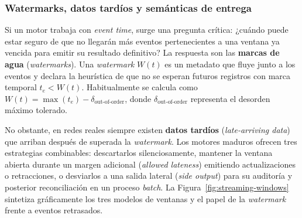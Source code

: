 \subsubsection{Watermarks, datos tardíos y semánticas de entrega}

Si un motor trabaja con \textit{event time}, surge una pregunta crítica: ¿cuándo puede estar seguro de que no llegarán más eventos pertenecientes a una ventana ya vencida para emitir su resultado definitivo? La respuesta son las \textbf{marcas de agua} (\textit{watermarks}). Una \textit{watermark} $W(t)$ es un metadato que fluye junto a los eventos y declara la heurística de que no se esperan futuros registros con marca temporal $t_e < W(t)$. Habitualmente se calcula como $W(t) = \max(t_e) - \delta_{\text{out-of-order}}$, donde $\delta_{\text{out-of-order}}$ representa el desorden máximo tolerado.

No obstante, en redes reales siempre existen \textbf{datos tardíos} (\textit{late-arriving data}) que arriban después de superada la \textit{watermark}. Los motores maduros ofrecen tres estrategias combinables: descartarlos silenciosamente, mantener la ventana abierta durante un margen adicional (\textit{allowed lateness}) emitiendo actualizaciones o retracciones, o desviarlos a una salida lateral (\textit{side output}) para su auditoría y posterior reconciliación en un proceso \textit{batch}. La Figura~\ref{fig:streaming-windows} sintetiza gráficamente los tres modelos de ventanas y el papel de la \textit{watermark} frente a eventos retrasados.

